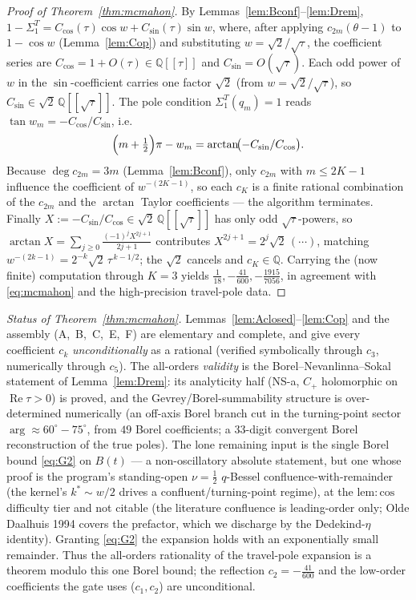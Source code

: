 \begin{proof}[Proof of Theorem~\ref{thm:mcmahon}]
By Lemmas~\ref{lem:Bconf}--\ref{lem:Drem}, $1-\Sigma_1^T=C_{\cos}(\tau)\cos w+C_{\sin}(\tau)\sin w$, where, after
applying $c_{2m}(\theta-1)$ to $1-\cos w$ (Lemma~\ref{lem:Cop}) and substituting $w=\sqrt2/\!\sqrt\tau$, the
coefficient series are $C_{\cos}=1+O(\tau)\in\mathbb Q[[\tau]]$ and $C_{\sin}=O(\sqrt\tau)$. Each odd power of $w$
in the $\sin$-coefficient carries one factor $\sqrt2$ (from $w=\sqrt2/\!\sqrt\tau$), so
$C_{\sin}\in\sqrt2\,\mathbb Q[[\sqrt\tau]]$. The pole condition $\Sigma_1^T(q_m)=1$ reads
$\tan w_m=-C_{\cos}/C_{\sin}$, i.e.
\[
  \Bigl(m+\tfrac12\Bigr)\pi-w_m=\arctan\!\bigl(-C_{\sin}/C_{\cos}\bigr).
\]
Because $\deg c_{2m}=3m$ (Lemma~\ref{lem:Bconf}), only $c_{2m}$ with $m\le2K-1$ influence the coefficient of
$w^{-(2K-1)}$, so each $c_K$ is a finite rational combination of the $c_{2m}$ and the $\arctan$ Taylor
coefficients --- the algorithm terminates. Finally $X:=-C_{\sin}/C_{\cos}\in\sqrt2\,\mathbb Q[[\sqrt\tau]]$ has only
odd $\sqrt\tau$-powers, so $\arctan X=\sum_{j\ge0}\frac{(-1)^jX^{2j+1}}{2j+1}$ contributes
$X^{2j+1}=2^{j}\sqrt2\,(\cdots)$, matching $w^{-(2k-1)}=2^{-k}\sqrt2\,\tau^{\,k-1/2}$; the $\sqrt2$ cancels and
$c_K\in\mathbb Q$. Carrying the (now finite) computation through $K=3$ yields
$\tfrac1{18},-\tfrac{41}{600},-\tfrac{1915}{7056}$, in agreement with \eqref{eq:mcmahon} and the high-precision
travel-pole data.
\end{proof}

\noindent\emph{Status of Theorem~\ref{thm:mcmahon}.} Lemmas~\ref{lem:Aclosed}--\ref{lem:Cop} and the assembly
(A,~B,~C,~E,~F) are elementary and complete, and give every coefficient $c_k$ \emph{unconditionally} as a rational
(verified symbolically through $c_3$, numerically through $c_5$). The all-orders \emph{validity} is the
Borel--Nevanlinna--Sokal statement of Lemma~\ref{lem:Drem}: its analyticity half (NS-a, $C_+$ holomorphic on
$\operatorname{Re}\tau>0$) is proved, and the Gevrey/Borel-summability structure is over-determined numerically
(an off-axis Borel branch cut in the turning-point sector $\arg\approx60^\circ\!-\!75^\circ$, from $49$ Borel
coefficients; a $33$-digit convergent Borel reconstruction of the true poles). The lone remaining input is the
single Borel bound \eqref{eq:G2} on $B(t)$ --- a non-oscillatory absolute
statement, but one whose proof is the program's standing-open $\nu=\tfrac12$ $q$-Bessel confluence-with-remainder
(the kernel's $k^\ast\sim w/2$ drives a confluent/turning-point regime), at the $\mathrm{lem:cos}$ difficulty tier
and not citable (the literature confluence is leading-order only; Olde Daalhuis 1994 covers the prefactor, which we
discharge by the Dedekind-$\eta$ identity). Granting \eqref{eq:G2} the expansion holds with an exponentially small
remainder. Thus the all-orders rationality of the travel-pole expansion is a theorem modulo this one Borel bound;
the reflection $c_2=-\tfrac{41}{600}$ and the low-order coefficients the gate uses ($c_1,c_2$) are unconditional.

